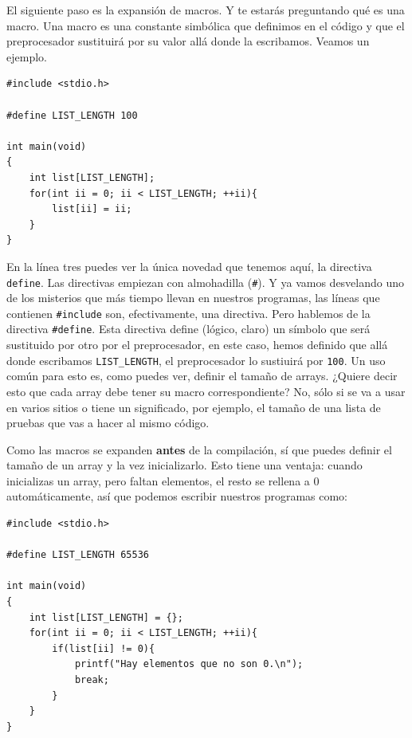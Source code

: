 \documentclass[a4paper]{article}
\begin{document}
El siguiente paso es la expansión de macros. Y te estarás
preguntando qué es una macro. Una macro es una constante simbólica que definimos
en el código y que el preprocesador sustituirá por su valor allá donde la
escribamos. Veamos un ejemplo.

\noindent
\begin{minipage}[H]{\linewidth}
\mbox{}
\begin{lstlisting}[style=C,
caption={Directiva \texttt{define}},
label={lst:defineDirective}]
#include <stdio.h>

#define LIST_LENGTH 100

int main(void)
{
    int list[LIST_LENGTH];
    for(int ii = 0; ii < LIST_LENGTH; ++ii){
        list[ii] = ii;
    }
}
\end{lstlisting}
\end{minipage}


En la línea tres puedes ver la única novedad que tenemos aquí, la directiva
\verb!define!. Las directivas empiezan con almohadilla (\verb!#!). Y ya vamos
desvelando uno de los misterios que más tiempo llevan en nuestros programas, las
líneas que contienen \verb!#include! son, efectivamente, una directiva. Pero
hablemos de la directiva \verb!#define!. Esta directiva define (lógico, claro)
un símbolo que será sustituido por otro por el preprocesador, en este caso,
hemos definido que allá donde escribamos \verb!LIST_LENGTH!, el preprocesador
lo sustiuirá por \verb!100!. Un uso común para esto es, como puedes ver,
definir el tamaño de arrays. ¿Quiere decir esto que cada array debe tener
su macro correspondiente? No, sólo si se va a usar en varios sitios o tiene
un significado, por ejemplo, el tamaño de una lista de pruebas que vas a
hacer al mismo código.

Como las macros se expanden \textbf{antes} de la compilación, sí que puedes
definir el tamaño de un array y la vez inicializarlo. Esto tiene una ventaja:
cuando inicializas un array, pero faltan elementos, el resto se rellena a 0
automáticamente, así que podemos escribir nuestros programas como:


\noindent
\begin{minipage}[H]{\linewidth}
\mbox{}
\begin{lstlisting}[style=C,
caption={Uso de \texttt{define} con arrays},
label={lst:defineArray}]
#include <stdio.h>

#define LIST_LENGTH 65536

int main(void)
{
    int list[LIST_LENGTH] = {};
    for(int ii = 0; ii < LIST_LENGTH; ++ii){
        if(list[ii] != 0){
            printf("Hay elementos que no son 0.\n");
            break;
        }
    }
}
\end{lstlisting}
\end{minipage}
\end{document}
